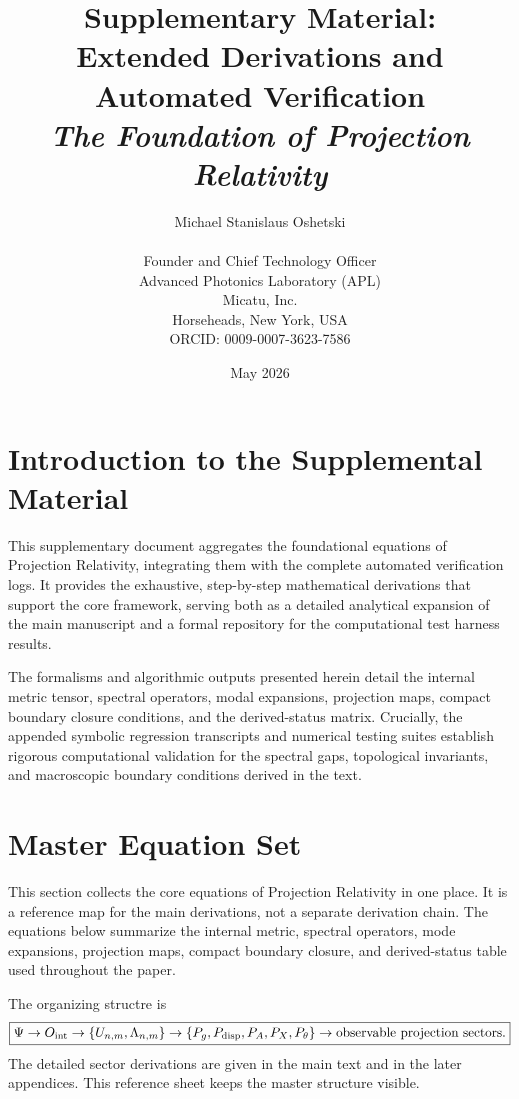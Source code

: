 \documentclass[11pt]{article}
\title{Supplementary Material: \\ 
\Large Extended Derivations and Automated Verification \\ 
\textit{The Foundation of Projection Relativity}}
\author{Michael Stanislaus Oshetski \orcidlink{0009-0007-3623-7586} \\[-6pt]
\small \email{michael.oshetski@micatu.com}\\[-3pt]
\small Founder and Chief Technology Officer \\[-6pt]
\small Advanced Photonics Laboratory (APL)\\[-6pt]
\small Micatu, Inc. \\[-6pt]
\small Horseheads, New York, USA \\[-6pt]
\small ORCID: 0009-0007-3623-7586}
\date{May 2026}
\begin{document}
\maketitle

\section{Introduction to the Supplemental Material}

This supplementary document aggregates the foundational equations of Projection Relativity, integrating them with the complete automated verification logs. It provides the exhaustive, step-by-step mathematical derivations that support the core framework, serving both as a detailed analytical expansion of the main manuscript and a formal repository for the computational test harness results.

The formalisms and algorithmic outputs presented herein detail the internal metric tensor, spectral operators, modal expansions, projection maps, compact boundary closure conditions, and the derived-status matrix. Crucially, the appended symbolic regression transcripts and numerical testing suites establish rigorous computational validation for the spectral gaps, topological invariants, and macroscopic boundary conditions derived in the text.

\renewcommand{\contentsname}{Table of Contents} %
\tableofcontents
\clearpage %


\section{Master Equation Set}
\label{app:how-to-use}

This section collects the core equations of Projection Relativity in one place. It is a reference map for the main derivations, not a separate derivation chain. The equations below summarize the internal metric, spectral operators, mode expansions, projection maps, compact boundary closure, and derived-status table used throughout the paper.

The organizing structre is
\begin{equation}
\boxed{
\Psi
\rightarrow
O_{\rm int}
\rightarrow
\{U_{n,m},\Lambda_{n,m}\}
\rightarrow
\{P_g,P_{\rm disp},P_A,P_X,P_\theta\}
\rightarrow
\text{observable projection sectors}.
}
\end{equation}
The detailed sector derivations are given in the main text and in the later appendices. This reference sheet keeps the master structure visible.
\end{document}
